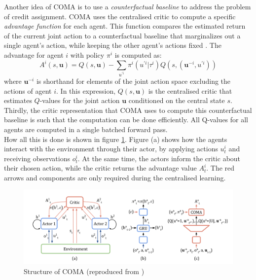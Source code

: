 Another idea of COMA is to use a \emph{counterfactual baseline} to address the problem of credit assignment. COMA uses the centralised critic to compute a specific \emph{advantage function} for each agent. This function compares the estimated return of the current joint action to a counterfactual baseline that marginalizes out a single agent's action, while keeping the other agent's actions fixed \cite{foerster2018counterfactual}. The advantage for agent $i$ with policy $\pi^{i}$ is computed as:
\begin{equation}
    \label{eqn:coma}
    A^i(s, \bm{u}) = Q(s, \bm{u}) - \sum_{u^{'i}} \pi^{i}(u^{'i}|\tau^i) Q(s, (\bm{u}^{-i}, u^{'i}))
\end{equation}
where $\bm{u}^{-i}$ is shorthand for elements of the joint action space excluding the actions of agent $i$. In this expression, $Q(s, \bm{u})$ is the centralised critic that estimates $Q$-values for the joint action $\bm{u}$ conditioned on the central state $s$.\\
Thirdly, the critic representation that COMA uses to compute this counterfactual baseline is such that the computation can be done efficiently. All Q-values for all agents are computed in a single batched forward pass.\\
How all this is done is shown in figure \ref{fig:coma_structure}. Figure (a) shows how the agents interact with the environment through their actor, by applying actions $u_t^i$ and receiving observations $o_t^i$. At the same time, the actors inform the critic about their chosen action, while the critic returns the advantage value $A_t^i$. The red arrows and components are only required during the centralised learning.\\

\begin{figure}[htp]
    \centering
    \includegraphics[width=16cm]{images/coma_structure.png}
    \caption{Structure of COMA (reproduced from \cite{foerster2018counterfactual})}
    \label{fig:coma_structure}
\end{figure}

